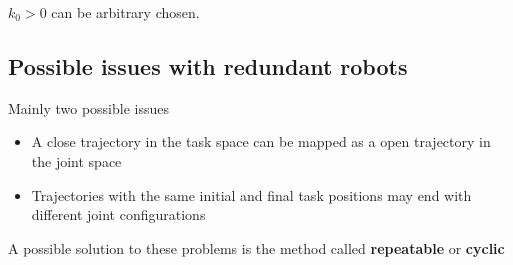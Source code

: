 $k_0 > 0$ can be arbitrary chosen. 

\subsection{Possible issues with redundant robots}

Mainly two possible issues

\begin{itemize}
	\item A close trajectory in the task space can be mapped as a open trajectory in the joint space
	\item Trajectories with the same initial and final task positions may end with different joint configurations
\end{itemize}

A possible solution to these problems is the method called \textbf{repeatable} or \textbf{cyclic}



